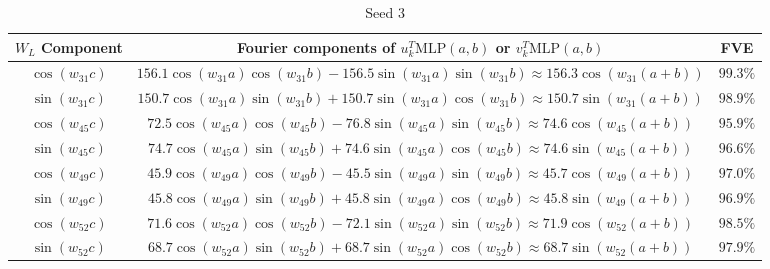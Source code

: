 \documentclass{article} %
\newcommand{\cosp}[1]{\cos \left ( #1 \right )}
\newcommand{\sinp}[1]{\sin \left ( #1 \right )}
\newcommand{\MLP}{\textrm{MLP}}
\begin{document}
\begin{table}[]
    \begin{subtable}{1\textwidth}
    \centering
        \begin{tabular}{c|c|c}
         $W_{L}$ Component & Fourier components of $u_k^T \MLP(a,b)$ or $v_k^T \MLP(a,b)$& FVE\\
         \hline 
       $\cosp{w_{31}c}$ & $156.1 \cosp{w_{31}a}\cosp{w_{31}b} -156.5 \sinp{w_{31}a}\sinp{w_{31}b}\approx 156.3  \cosp{w_{31}(a+b)} $& $99.3 \%$ \\
$\sinp{w_{31}c}$ & $150.7 \cosp{w_{31}a}\sinp{w_{31}b} + 150.7 \sinp{w_{31}a}\cosp{w_{31}b}\approx 150.7  \sinp{w_{31}(a+b)} $& $98.9 \%$ \\
$\cosp{w_{45}c}$ & $72.5 \cosp{w_{45}a}\cosp{w_{45}b} -76.8 \sinp{w_{45}a}\sinp{w_{45}b}\approx 74.6  \cosp{w_{45}(a+b)} $& $95.9 \%$ \\
$\sinp{w_{45}c}$ & $74.7 \cosp{w_{45}a}\sinp{w_{45}b} + 74.6 \sinp{w_{45}a}\cosp{w_{45}b}\approx 74.6  \sinp{w_{45}(a+b)} $& $96.6 \%$ \\
$\cosp{w_{49}c}$ & $45.9 \cosp{w_{49}a}\cosp{w_{49}b} -45.5 \sinp{w_{49}a}\sinp{w_{49}b}\approx 45.7  \cosp{w_{49}(a+b)} $& $97.0 \%$ \\
$\sinp{w_{49}c}$ & $45.8 \cosp{w_{49}a}\sinp{w_{49}b} + 45.8 \sinp{w_{49}a}\cosp{w_{49}b}\approx 45.8  \sinp{w_{49}(a+b)} $& $96.9 \%$ \\
$\cosp{w_{52}c}$ & $71.6 \cosp{w_{52}a}\cosp{w_{52}b} -72.1 \sinp{w_{52}a}\sinp{w_{52}b}\approx 71.9  \cosp{w_{52}(a+b)} $& $98.5 \%$ \\
$\sinp{w_{52}c}$ & $68.7 \cosp{w_{52}a}\sinp{w_{52}b} + 68.7 \sinp{w_{52}a}\cosp{w_{52}b}\approx 68.7  \sinp{w_{52}(a+b)} $& $97.9 \%$ \\
    \end{tabular}
    \caption{Seed 3}
    \end{subtable}


\end{table}
\end{document}
